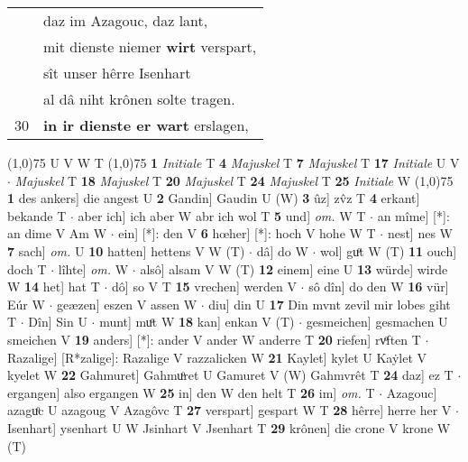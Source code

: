 \documentclass[8pt,a4paper,notitlepage]{article}
\begin{document}
\begin{table}[ht]
\begin{minipage}[t]{0.5\linewidth}
\begin{tabular}{rl}
 & daz im Azagouc, daz lant,\\ 
 & mit dienste niemer \textbf{wirt} verspart,\\ 
 & sît unser hêrre Isenhart\\ 
 & al dâ niht krônen solte tragen.\\ 
30 & \textbf{in ir dienste er wart} erslagen,\\ 
\end{tabular}
\scriptsize
\line(1,0){75} \newline
U V W T \newline
\line(1,0){75} \newline
\textbf{1} \textit{Initiale} T  \textbf{4} \textit{Majuskel} T  \textbf{7} \textit{Majuskel} T  \textbf{17} \textit{Initiale} U V   $\cdot$ \textit{Majuskel} T  \textbf{18} \textit{Majuskel} T  \textbf{20} \textit{Majuskel} T  \textbf{24} \textit{Majuskel} T  \textbf{25} \textit{Initiale} W  \newline
\line(1,0){75} \newline
\textbf{1} des ankers] die angest U \textbf{2} Gandin] Gaudin U (W) \textbf{3} ûz] zv̂z T \textbf{4} erkant] bekande T  $\cdot$ aber ich] ich aber W abr ich wol T \textbf{5} und] \textit{om.} W T  $\cdot$ an mîme] [*]: an dime V Am W  $\cdot$ ein] [*]: den V \textbf{6} hœher] [*]: hoch V hohe W T  $\cdot$ nest] nes W \textbf{7} sach] \textit{om.} U \textbf{10} hatten] hettens V W (T)  $\cdot$ dâ] do W  $\cdot$ wol] guͦt W (T) \textbf{11} ouch] doch T  $\cdot$ lîhte] \textit{om.} W  $\cdot$ alsô] alsam V W (T) \textbf{12} einem] eine U \textbf{13} würde] wirde W \textbf{14} het] hat T  $\cdot$ dô] so V T \textbf{15} vrechen] werden V  $\cdot$ sô dîn] do den W \textbf{16} vür] Eúr W  $\cdot$ geæzen] eszen V assen W  $\cdot$ diu] din U \textbf{17} Din mvnt zevil mir lobes giht T  $\cdot$ Dîn] Sin U  $\cdot$ munt] muͦt W \textbf{18} kan] enkan V (T)  $\cdot$ gesmeichen] gesmachen U smeichen V \textbf{19} anders] [*]: ander V ander W anderre T \textbf{20} riefen] rvͦften T  $\cdot$ Razalige] [R*zalige]: Razalige V razzalicken W \textbf{21} Kaylet] kylet U Kaẏlet V kyelet W \textbf{22} Gahmuret] Gahmuͦret U Gamuret V (W) Gahmvrêt T \textbf{24} daz] ez T  $\cdot$ ergangen] also ergangen W \textbf{25} in] den W den helt T \textbf{26} im] \textit{om.} T  $\cdot$ Azagouc] azaguͦc U azagoug V Azagôvc T \textbf{27} verspart] gespart W T \textbf{28} hêrre] herre her V  $\cdot$ Isenhart] ysenhart U W Jsinhart V Jsenhart T \textbf{29} krônen] die crone V krone W (T) \newline
\end{minipage}
\end{table}
\end{document}

